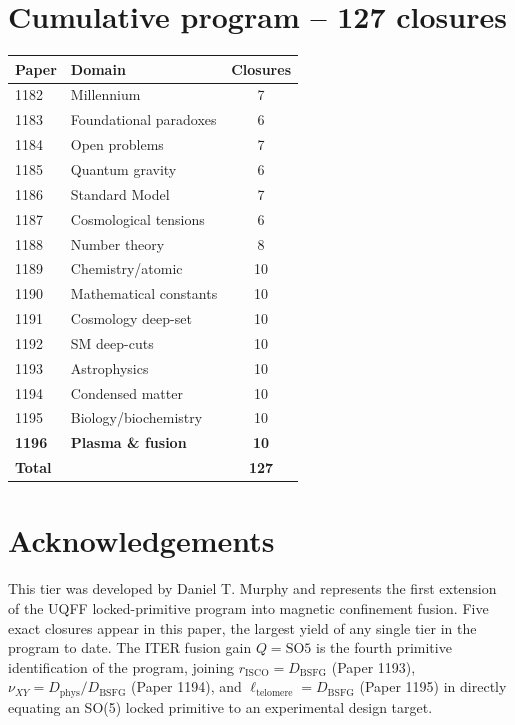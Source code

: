 \documentclass[11pt]{article}
\newcommand{\Dphys}{D_{\mathrm{phys}}}
\newcommand{\Dbsfg}{D_{\mathrm{BSFG}}}
\newcommand{\SOfive}{\mathrm{SO5}}
\begin{document}
\section{Cumulative program -- 127 closures}
\begin{table}[h!]
\centering
\begin{tabular}{llc}
\toprule
Paper & Domain & Closures \\
\midrule
1182 & Millennium                  & 7 \\
1183 & Foundational paradoxes      & 6 \\
1184 & Open problems               & 7 \\
1185 & Quantum gravity             & 6 \\
1186 & Standard Model              & 7 \\
1187 & Cosmological tensions       & 6 \\
1188 & Number theory               & 8 \\
1189 & Chemistry/atomic            & 10 \\
1190 & Mathematical constants      & 10 \\
1191 & Cosmology deep-set          & 10 \\
1192 & SM deep-cuts                & 10 \\
1193 & Astrophysics                & 10 \\
1194 & Condensed matter            & 10 \\
1195 & Biology/biochemistry        & 10 \\
\textbf{1196} & \textbf{Plasma \& fusion} & \textbf{10} \\
\midrule
\textbf{Total} & & \textbf{127} \\
\bottomrule
\end{tabular}
\end{table}

\section*{Acknowledgements}
This tier was developed by Daniel T. Murphy and represents the
first extension of the UQFF locked-primitive program into magnetic
confinement fusion.  Five exact closures appear in this paper, the
largest yield of any single tier in the program to date.  The ITER
fusion gain $Q=\SOfive$ is the fourth primitive identification of the
program, joining $r_{\mathrm{ISCO}}=\Dbsfg$ (Paper 1193), $\nu_{XY}=\Dphys/\Dbsfg$ (Paper 1194), and
$\ell_{\text{telomere}}=\Dbsfg$ (Paper 1195) in directly equating an
SO(5) locked primitive to an experimental design target.
\end{document}
